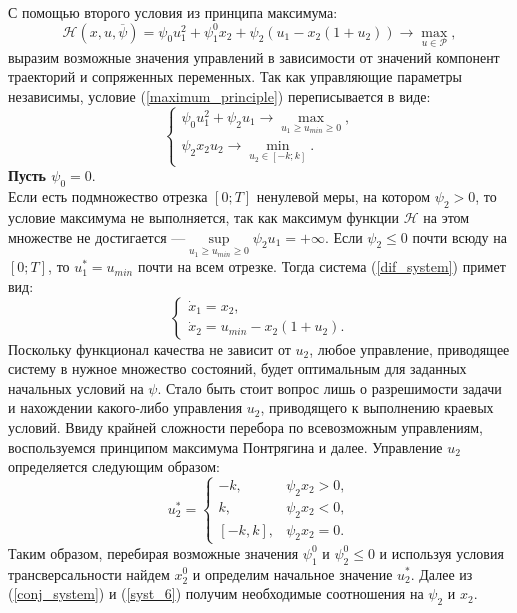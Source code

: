 \documentclass[10pt]{article}
\begin{document}
С помощью второго условия из принципа максимума:
\begin{equation}\label{maximum_principle}
	\mathcal{H}(x, u, \overline{\psi}) = \psi_0 u_1^2 + \psi_1^0 x_2 + \psi_2(u_1 - x_2(1 + u_2)) \to \max\limits_{u \in \mathcal{P}}, 
\end{equation}
выразим возможные значения управлений в зависимости от значений компонент траекторий и сопряженных переменных. 
Так как управляющие параметры независимы, условие (\ref{maximum_principle}) переписывается в виде:
\begin{equation}\label{maximum_conditions}
	\begin{cases}
		\psi_0 u_1^2 + \psi_2 u_1 \to \max\limits_{u_1 \ge u_{min} \ge 0},
		\\
		\psi_2 x_2 u_2 \to \min\limits_{u_2 \in [-k;k]}.
	\end{cases}
\end{equation}
\textbf{Пусть \( \psi_0 = 0 \)}.\medskip \\
		Если есть подмножество отрезка \( [0;T] \) ненулевой меры, на котором \( \psi_2 > 0 \), то условие максимума не выполняется, так как  максимум функции \( \mathcal{H} \) на этом множестве не достигается ---\(  \sup\limits_{u_1 \ge u_{min} \ge 0} \psi_2 u_1 = +\infty \). 
		Если \( \psi_2 \le 0 \) почти всюду на \( [0;T] \), то \( u_1^* = u_{min} \) почти на всем отрезке. Тогда система (\ref{dif_system}) примет вид:
		\begin{equation}\label{syst_6}
			\begin{cases}
				\dot{x}_1 = x_2,
				\\
				\dot{x}_2 = u_{min} - x_2(1 + u_2).
			\end{cases}
		\end{equation}
	Поскольку функционал качества не зависит от \( u_2 \), любое управление, приводящее систему в нужное множество состояний, будет оптимальным для заданных начальных условий на \( \psi \). Стало быть стоит вопрос лишь о разрешимости задачи и нахождении какого-либо управления \( u_2 \), приводящего к выполнению краевых условий. Ввиду крайней сложности перебора по всевозможным управлениям, воспользуемся принципом максимума Понтрягина и далее. 
	Управление \( u_2 \) определяется следующим образом:
	\[ u_2^* = \begin{cases} 
				-k  , & \psi_2 x_2 > 0 , 
				\\ 
				k  , & \psi_2 x_2 < 0 , 
				\\ 
				[-k, k]  , & \psi_2 x_2 = 0. \end{cases} \]	
	Таким образом, перебирая возможные значения \( \psi_1^0 \) и \( \psi_2^0 \le 0 \) и используя условия трансверсальности найдем \( x_2^0 \) и определим начальное значение \( u_2^* \).  Далее из (\ref{conj_system}) и (\ref{syst_6}) получим необходимые соотношения на \( \psi_2 \) и \( x_2 \). 
	
\end{document}
